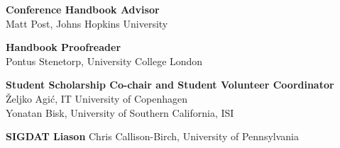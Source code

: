 {\bf Conference Handbook Advisor}\\
Matt Post, Johns Hopkins University

{\bf Handbook Proofreader}\\
Pontus Stenetorp, University College London

{\bf Student Scholarship Co-chair and Student Volunteer Coordinator}\\
Željko Agić, IT University of Copenhagen\\
Yonatan Bisk, University of Southern California, ISI

{\bf SIGDAT Liason}
Chris Callison-Birch, University of Pennsylvania
%
%
%
%
%
%
%
%
%
%

